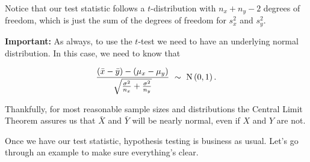 \begin{table}[h]

\begin{center}


\end{center}

\end{table}

Notice that our test statistic follows a $t$-distribution with $n_x + n_y -2$ degrees of freedom, which is just the sum of the degrees of freedom for $s^2_x$ and $s^2_y$.



\textbf{Important:} As always, to use the $t$-test we need to have an underlying normal distribution.  In this case, we need to know that



\begin{equation*}

\frac{\left(\bar{x} - \bar{y}\right) - \left(\mu_x - \mu_y\right)}{\sqrt{\frac{\sigma^2}{n_x} + \frac{\sigma^2}{n_y}}} \ \sim \  {\rm N}\left(0,1\right).

\end{equation*}

Thankfully, for most reasonable sample sizes and distributions the Central Limit Theorem assures us that $\bar{X}$ and $\bar{Y}$ will be nearly normal, even if $X$ and $Y$ are not.



Once we have our test statistic, hypothesis testing is business as usual.  Let's go through an example to make sure everything's clear.



